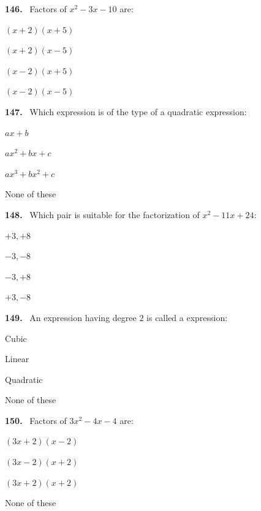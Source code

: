 \documentclass[11pt]{article}
\newenvironment{qenv}[1]{%
  \par\medskip\noindent\textbf{#1.}\ \ignorespaces
}{\par}
\begin{document}
\begin{qenv}{146} Factors of $x^2-3x-10$ are:
\begin{options} \item $(x+2)(x+5)$ \item $(x+2)(x-5)$ \item $(x-2)(x+5)$ \item $(x-2)(x-5)$ \end{options} \end{qenv}

\begin{qenv}{147} Which expression is of the type of a quadratic expression:
\begin{options} \item $ax+b$ \item $ax^2+bx+c$ \item $ax^3+bx^2+c$ \item None of these \end{options} \end{qenv}

\begin{qenv}{148} Which pair is suitable for the factorization of $x^2-11x+24$:
\begin{options} \item $+3,+8$ \item $-3,-8$ \item $-3,+8$ \item $+3,-8$ \end{options} \end{qenv}

\begin{qenv}{149} An expression having degree $2$ is called a \underline{\hspace{2cm}} expression:
\begin{options} \item Cubic \item Linear \item Quadratic \item None of these \end{options} \end{qenv}

\begin{qenv}{150} Factors of $3x^2-4x-4$ are:
\begin{options} \item $(3x+2)(x-2)$ \item $(3x-2)(x+2)$ \item $(3x+2)(x+2)$ \item None of these \end{options} \end{qenv}
\end{document}
